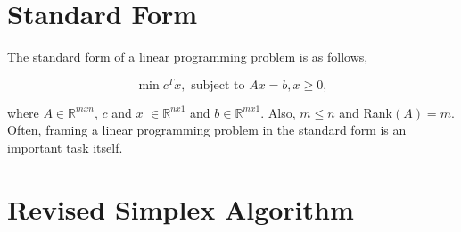 \documentclass[12pt,letterpaper]{article}
\newcommand{\R}{\mathbb{R}}
\begin{document}
\section{Standard Form}

The standard form of a linear programming problem is as follows,

\begin{equation*}
\min c^{T}x, \text{ subject to } Ax = b, x \geq 0,
\end{equation*}

where $A \in \R^{mxn}$, $c$ and $x$ $\in \R^{nx1}$ and $b \in \R^{mx1}$. Also, $m \leq n$ and Rank$(A) = m$. Often, framing a linear programming problem in the standard form is an important task itself.

\section{Revised Simplex Algorithm}

\begin{center}
\end{center}
\end{document}

